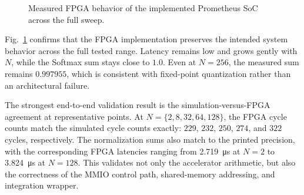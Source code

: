 \documentclass[conference]{IEEEtran}
\begin{document}
\begin{figure}[!t]
\centering
{}

\vspace{2mm}

\caption{Measured FPGA behavior of the implemented Prometheus SoC across the full sweep.}
\label{fig:fpga_validation}
\end{figure}

Fig.~\ref{fig:fpga_validation} confirms that the FPGA implementation preserves the intended system behavior across the full tested range. Latency remains low and grows gently with $N$, while the Softmax sum stays close to $1.0$. Even at $N=256$, the measured sum remains $0.997955$, which is consistent with fixed-point quantization rather than an architectural failure.

The strongest end-to-end validation result is the simulation-versus-FPGA agreement at representative points. At $N=\{2,8,32,64,128\}$, the FPGA cycle counts match the simulated cycle counts exactly: $229$, $232$, $250$, $274$, and $322$ cycles, respectively. The normalization sums also match to the printed precision, with the corresponding FPGA latencies ranging from \SI{2.719}{\micro\second} at $N=2$ to \SI{3.824}{\micro\second} at $N=128$. This validates not only the accelerator arithmetic, but also the correctness of the MMIO control path, shared-memory addressing, and integration wrapper.
\end{document}
